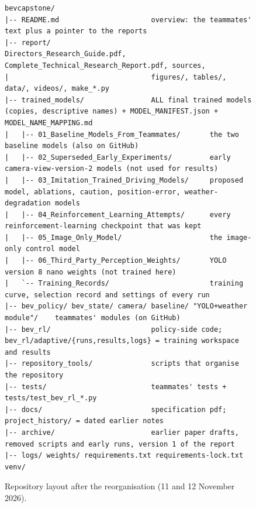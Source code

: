\begin{figure}[H]
\begin{lstlisting}[frame=single,basicstyle=\ttfamily\scriptsize]
bevcapstone/
|-- README.md                      overview: the teammates' text plus a pointer to the reports
|-- report/                        Directors_Research_Guide.pdf, Complete_Technical_Research_Report.pdf, sources,
|                                  figures/, tables/, data/, videos/, make_*.py
|-- trained_models/                ALL final trained models (copies, descriptive names) + MODEL_MANIFEST.json + MODEL_NAME_MAPPING.md
|   |-- 01_Baseline_Models_From_Teammates/       the two baseline models (also on GitHub)
|   |-- 02_Superseded_Early_Experiments/         early camera-view-version-2 models (not used for results)
|   |-- 03_Imitation_Trained_Driving_Models/     proposed model, ablations, caution, position-error, weather-degradation models
|   |-- 04_Reinforcement_Learning_Attempts/      every reinforcement-learning checkpoint that was kept
|   |-- 05_Image_Only_Model/                     the image-only control model
|   |-- 06_Third_Party_Perception_Weights/       YOLO version 8 nano weights (not trained here)
|   `-- Training_Records/                        training curve, selection record and settings of every run
|-- bev_policy/ bev_state/ camera/ baseline/ "YOLO+weather module"/    teammates' modules (on GitHub)
|-- bev_rl/                        policy-side code; bev_rl/adaptive/{runs,results,logs} = training workspace and results
|-- repository_tools/              scripts that organise the repository
|-- tests/                         teammates' tests + tests/test_bev_rl_*.py
|-- docs/                          specification pdf; project_history/ = dated earlier notes
|-- archive/                       earlier paper drafts, removed scripts and early runs, version 1 of the report
|-- logs/ weights/ requirements.txt requirements-lock.txt venv/
\end{lstlisting}
\caption{Repository layout after the reorganisation (11 and 12 November 2026).}\label{fig:tree}
\end{figure}

